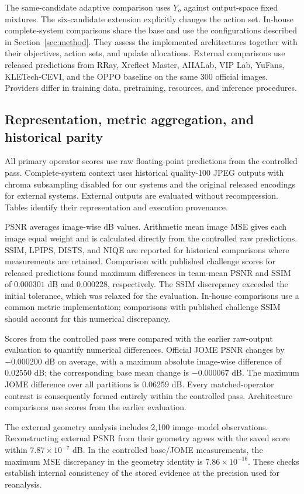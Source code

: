 \documentclass[12pt]{article}
\begin{document}
The same-candidate adaptive comparison uses $Y_o$ against output-space fixed mixtures. The six-candidate extension explicitly changes the action set. In-house complete-system comparisons share the base and use the configurations described in Section~\ref{sec:method}. They assess the implemented architectures together with their objectives, action sets, and update allocations. External comparisons use released predictions from RRay, Xreflect Master, AIIALab, VIP Lab, YuFans, KLETech-CEVI, and the OPPO baseline on the same 300 official images. Providers differ in training data, pretraining, resources, and inference procedures.

\subsection{Representation, metric aggregation, and historical parity}
All primary operator scores use raw floating-point predictions from the controlled pass. Complete-system context uses historical quality-100 JPEG outputs with chroma subsampling disabled for our systems and the original released encodings for external systems. External outputs are evaluated without recompression. Tables identify their representation and execution provenance.

PSNR averages image-wise dB values. Arithmetic mean image MSE gives each image equal weight and is calculated directly from the controlled raw predictions. SSIM, LPIPS, DISTS, and NIQE are reported for historical comparisons where measurements are retained. Comparison with published challenge scores for released predictions found maximum differences in team-mean PSNR and SSIM of $0.000301$ dB and $0.000228$, respectively. The SSIM discrepancy exceeded the initial tolerance, which was relaxed for the evaluation. In-house comparisons use a common metric implementation; comparisons with published challenge SSIM should account for this numerical discrepancy.

Scores from the controlled pass were compared with the earlier raw-output evaluation to quantify numerical differences. Official JOME PSNR changes by $-0.000200$ dB on average, with a maximum absolute image-wise difference of 0.02550 dB; the corresponding base mean change is $-0.000067$ dB. The maximum JOME difference over all partitions is 0.06259 dB. Every matched-operator contrast is consequently formed entirely within the controlled pass. Architecture comparisons use scores from the earlier evaluation.

The external geometry analysis includes 2,100 image--model observations. Reconstructing external PSNR from their geometry agrees with the saved score within $7.87\times10^{-7}$ dB. In the controlled base/JOME measurements, the maximum MSE discrepancy in the geometry identity is $7.86\times10^{-16}$. These checks establish internal consistency of the stored evidence at the precision used for reanalysis.
\end{document}
